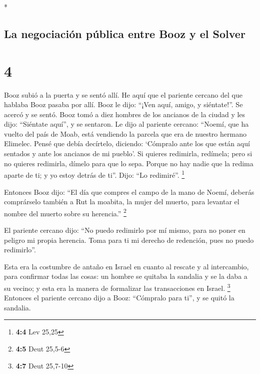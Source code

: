 \begin{paracol}{2}
\begin{otherlanguage}{english}
\end{otherlanguage}

\switchcolumn[0]*

\hypertarget{la-negociaciuxf3n-puxfablica-entre-booz-y-el-solver}{%
\subsection{La negociación pública entre Booz y el
Solver}\label{la-negociaciuxf3n-puxfablica-entre-booz-y-el-solver}}

\hypertarget{section-6}{%
\section{4}\label{section-6}}

 Booz subió a la puerta y se sentó allí. He aquí que el
pariente cercano del que hablaba Booz pasaba por allí. Booz le dijo:
``¡Ven aquí, amigo, y siéntate!''. Se acercó y se sentó. 
Booz tomó a diez hombres de los ancianos de la ciudad y les dijo:
``Siéntate aquí'', y se sentaron.  Le dijo al pariente
cercano: ``Noemí, que ha vuelto del país de Moab, está vendiendo la
parcela que era de nuestro hermano Elimelec.  Pensé que
debía decírtelo, diciendo: `Cómpralo ante los que están aquí sentados y
ante los ancianos de mi pueblo'. Si quieres redimirla, redímela; pero si
no quieres redimirla, dímelo para que lo sepa. Porque no hay nadie que
la redima aparte de ti; y yo estoy detrás de ti''. Dijo: ``Lo
redimiré''. \footnote{\textbf{4:4} Lev 25,25}

 Entonces Booz dijo: ``El día que compres el campo de la
mano de Noemí, deberás comprárselo también a Rut la moabita, la mujer
del muerto, para levantar el nombre del muerto sobre su herencia.''
\footnote{\textbf{4:5} Deut 25,5-6}

 El pariente cercano dijo: ``No puedo redimirlo por mí
mismo, para no poner en peligro mi propia herencia. Toma para ti mi
derecho de redención, pues no puedo redimirlo''.

 Esta era la costumbre de antaño en Israel en cuanto al
rescate y al intercambio, para confirmar todas las cosas: un hombre se
quitaba la sandalia y se la daba a su vecino; y esta era la manera de
formalizar las transacciones en Israel. \footnote{\textbf{4:7} Deut
  25,7-10}  Entonces el pariente cercano dijo a Booz:
``Cómpralo para ti'', y se quitó la sandalia.


\end{paracol}
